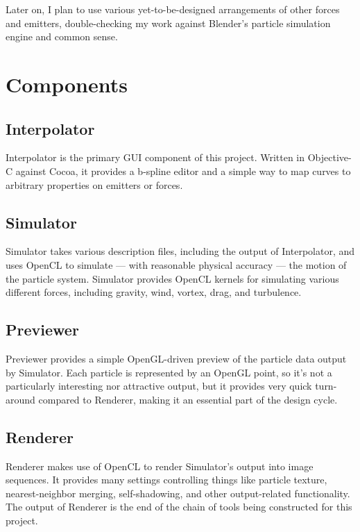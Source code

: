 \documentclass{acmsiggraph}
\begin{document}
Later on, I plan to use various yet-to-be-designed arrangements of other forces and emitters, double-checking my work against Blender's particle simulation engine and common sense.

\section{Components}

\subsection{Interpolator}

Interpolator is the primary GUI component of this project. Written in Objective-C against Cocoa, it provides a b-spline editor and a simple way to map curves to arbitrary properties on emitters or forces.

\subsection{Simulator}

Simulator takes various description files, including the output of Interpolator, and uses OpenCL to simulate --- with reasonable physical accuracy --- the motion of the particle system. Simulator provides OpenCL kernels for simulating various different forces, including gravity, wind, vortex, drag, and turbulence.

\subsection{Previewer}

Previewer provides a simple OpenGL-driven preview of the particle data output by Simulator. Each particle is represented by an OpenGL point, so it's not a particularly interesting nor attractive output, but it provides very quick turn-around compared to Renderer, making it an essential part of the design cycle.

\subsection{Renderer}

Renderer makes use of OpenCL to render Simulator's output into image sequences. It provides many settings controlling things like particle texture, nearest-neighbor merging, self-shadowing, and other output-related functionality. The output of Renderer is the end of the chain of tools being constructed for this project.
\end{document}

